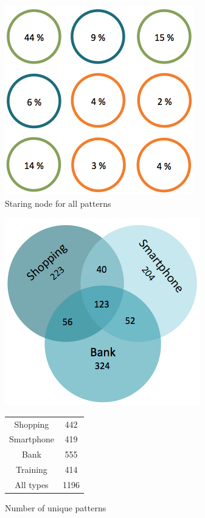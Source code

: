     \begin{figure}[H]
      \centering
      \includegraphics[scale=0.45]{pics/analysis/startingNode.png}
      \caption{Staring node for all patterns}
      \label{fig:startingNode}
    \end{figure}

    \begin{figure}
      \centering
      \begin{minipage}[b]{0.40\linewidth}
      \centering
        \includegraphics[scale=0.4]{pics/analysis/uniquePatternsVenn.png}
      \end{minipage}%
      \begin{minipage}[b]{0.30\linewidth}
        \centering
        \begin{tabular}{ c | c }
          \hline
          Shopping &  442 \\
          Smartphone & 419 \\
          Bank & 555 \\
          Training & 414 \\ \hline \hline
          All types & 1196 \\ \hline
        \end{tabular}
        \vspace{1cm}
      \end{minipage}
      \caption{Number of unique patterns}
      \label{fig:test}
    \end{figure}

